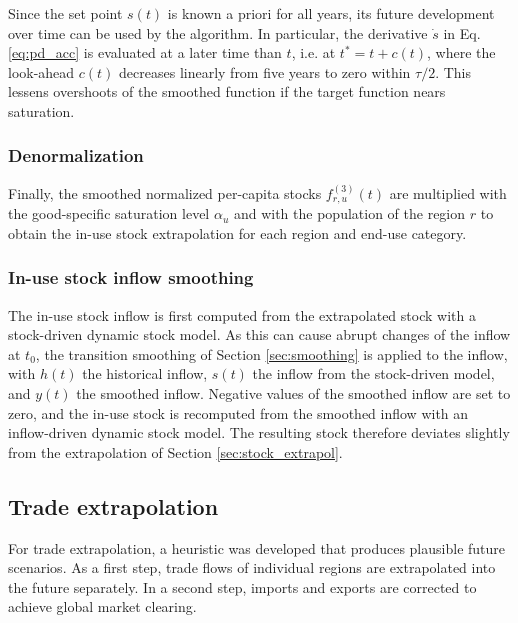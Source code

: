 Since the set point $s(t)$ is known a priori for all years, its future development over time can be used by the algorithm. In particular, the derivative $\dot{s}$ in Eq. \eqref{eq:pd_acc} is evaluated at a later time than $t$, i.e. at $t^*=t+c(t)$, where the look-ahead $c(t)$ decreases linearly from five years to zero within $\tau/2$.
This lessens overshoots of the smoothed function if the target function nears saturation.

\subsubsection{Denormalization}

Finally, the smoothed normalized per-capita stocks $f^{(3)}_{r,u}(t)$ are multiplied with the good-specific saturation level $\alpha_u$ and with the population of the region $r$ to obtain the in-use stock extrapolation for each region and end-use category.

\subsubsection{In-use stock inflow smoothing} \label{sec:inflow_smoothing}

The in-use stock inflow is first computed from the extrapolated stock with a stock-driven dynamic stock model. As this can cause abrupt changes of the inflow at $t_{0}$, the transition smoothing of Section \ref{sec:smoothing} is applied to the inflow, with $h(t)$ the historical inflow, $s(t)$ the inflow from the stock-driven model, and $y(t)$ the smoothed inflow. Negative values of the smoothed inflow are set to zero, and the in-use stock is recomputed from the smoothed inflow with an inflow-driven dynamic stock model. The resulting stock therefore deviates slightly from the extrapolation of Section \ref{sec:stock_extrapol}.

\subsection{Trade extrapolation} \label{sec:trade_extrapol}

For trade extrapolation, a heuristic was developed that produces plausible future scenarios.
As a first step, trade flows of individual regions are extrapolated into the future separately. In a second step, imports and exports are corrected to achieve global market clearing.

